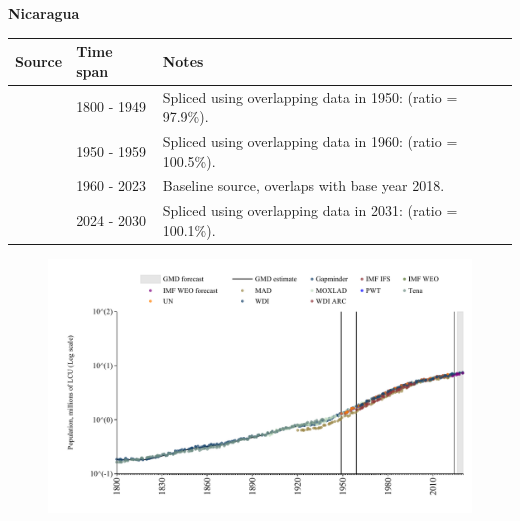 \documentclass[12pt,a4paper,landscape]{article}
\begin{document}
\begin{adjustbox}{max totalsize={\paperwidth}{\paperheight},center}
\begin{minipage}[t][\textheight][t]{\textwidth}
\vspace*{0.5cm}
{}
\begin{center}
{\Large\bfseries Nicaragua}
\end{center}
\vspace{0.5cm}
\begin{table}[H]
\centering
\small
\begin{tabular}{|l|l|l|}
\hline
\textbf{Source} & \textbf{Time span} & \textbf{Notes} \\
\hline
\rowcolor{white}\cite{Gapminder}& 1800 - 1949 &Spliced using overlapping data in 1950: (ratio = 97.9\%).\\
\rowcolor{lightgray}\cite{IMF_IFS}& 1950 - 1959 &Spliced using overlapping data in 1960: (ratio = 100.5\%).\\
\rowcolor{white}\cite{WDI}& 1960 - 2023 &Baseline source, overlaps with base year 2018.\\
\rowcolor{lightgray}\cite{Gapminder}& 2024 - 2030 &Spliced using overlapping data in 2031: (ratio = 100.1\%).\\
\hline
\end{tabular}
\end{table}
\begin{figure}[H]
\centering
\includegraphics[width=\textwidth,height=0.6\textheight,keepaspectratio]{graphs/NIC_pop.pdf}
\end{figure}
\end{minipage}
\end{adjustbox}
\end{document}
